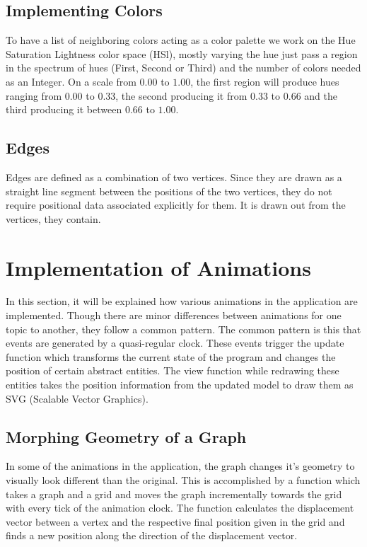 \subsection{Implementing Colors}
To have a list of neighboring colors acting as a color palette we work on the Hue Saturation Lightness
color space (HSl), mostly varying the hue
just pass a
region in the spectrum of hues (First, Second or Third) and the number of
colors needed as an Integer. On a scale from $0.00$ to $1.00$, the first region will produce hues ranging from $0.00$ to $0.33$,
the second producing it from $0.33$ to $0.66$ and the third producing it between $0.66$ to $1.00$.


\subsection{Edges}
Edges are defined as a combination of two vertices. Since they are drawn as a
straight line segment between the positions of the two vertices, they do not require
positional data associated explicitly for them. It is drawn out from the vertices,
they contain.


\section{Implementation of Animations}
In this section, it will be explained how various animations in the
application are implemented. Though there are minor differences between animations
for one topic to another, they follow a common pattern. The common pattern is
this that events are generated by a quasi-regular clock. These events trigger
the update function which transforms the current state of the program and
changes the position of certain abstract entities. The view function while
redrawing these entities takes the position information from the updated model
to draw them as SVG (Scalable Vector Graphics).

\subsection{Morphing Geometry of a Graph}
In some of the animations in the application, the graph changes it's geometry to
visually look different than the original. This is accomplished by a function which takes a graph
and a grid and moves the graph incrementally towards the grid with every tick
of the animation clock.  The function calculates the displacement vector
between a vertex and the respective final position given in the grid and finds
a new position along the direction of the displacement vector.

